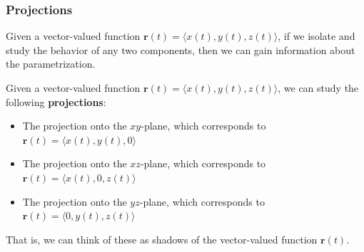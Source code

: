\subsubsection{Projections}

Given a vector-valued function $\bm{r}(t) = \langle x(t), y(t), z(t) \rangle$, if we isolate and study the behavior of any two components, then we can gain information about the parametrization.

\begin{definition}
Given a vector-valued function $\bm{r}(t) = \langle x(t), y(t), z(t) \rangle$, we can study the following \textbf{projections}:

\begin{itemize}
    \item The projection onto the $xy$-plane, which corresponds to $\bm{r}(t) = \langle x(t), y(t), 0 \rangle$
    \item The projection onto the $xz$-plane, which corresponds to $\bm{r}(t) = \langle x(t), 0, z(t) \rangle$
     \item The projection onto the $yz$-plane, which corresponds to $\bm{r}(t) = \langle 0, y(t), z(t) \rangle$
\end{itemize}

\end{definition}

That is, we can think of these as shadows of the vector-valued function $\bm{r}(t)$.

